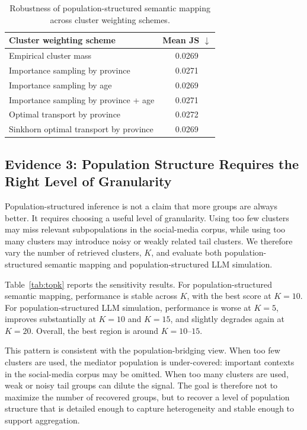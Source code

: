 \documentclass{article}
\begin{document}
\begin{table}[htb!]
\centering
\small
\begin{tabular}{lc}
\toprule
Cluster weighting scheme & Mean JS $\downarrow$ \\
\midrule
Empirical cluster mass & 0.0269 \\
Importance sampling by province & 0.0271 \\
Importance sampling by age & 0.0269 \\
Importance sampling by province + age & 0.0271 \\
Optimal transport by province & 0.0272 \\
Sinkhorn optimal transport by province & 0.0269 \\
\bottomrule
\end{tabular}
\caption{Robustness of population-structured semantic mapping across cluster weighting schemes.}
\label{tab:reweighting}
\end{table}

\subsection{Evidence 3: Population Structure Requires the Right Level of Granularity}
\label{sensitivity}

Population-structured inference is not a claim that more groups are always better.
It requires choosing a useful level of granularity.
Using too few clusters may miss relevant subpopulations in the social-media corpus, while
using too many clusters may introduce noisy or weakly related tail clusters.
We therefore vary the number of retrieved clusters, $K$, and evaluate both
population-structured semantic mapping and population-structured LLM simulation.

Table~\ref{tab:topk} reports the sensitivity results.
For population-structured semantic mapping, performance is stable across $K$, with the
best score at $K=10$.
For population-structured LLM simulation, performance is worse at $K=5$, improves
substantially at $K=10$ and $K=15$, and slightly degrades again at $K=20$.
Overall, the best region is around $K=10$--$15$.

This pattern is consistent with the population-bridging view.
When too few clusters are used, the mediator population is under-covered: important
contexts in the social-media corpus may be omitted.
When too many clusters are used, weak or noisy tail groups can dilute the signal.
The goal is therefore not to maximize the number of recovered groups, but to recover a
level of population structure that is detailed enough to capture heterogeneity and stable
enough to support aggregation.
\end{document}
